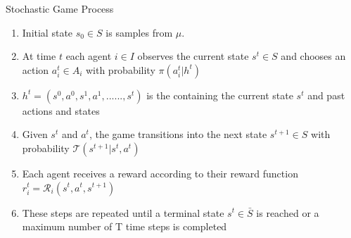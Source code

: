 \begin{frame}{Stochastic Game Process}

\begin{enumerate}
    \item<1-> Initial state $s_0 \in S$ is samples from $\mu$.
    \item<2-> At time $t$ each agent $i \in I$ observes the current state $s^{t} \in S$ and chooses an action $a^{t}_i \in A_i$ with probability $\pi(a^{t}_i|h^{t})$ 
    \vspace{2pt}
    \blist
        \item<3-> $h^t = (s^0, a^0, s^1, a^1, ......, s^t)$ is the  containing the current state $s^t$ and past  actions and states
    \elist
    \vspace{2pt}
    \item<4-> Given $s^t$ and $a^t$, the game transitions into the next state $s^{t+1} \in S$ with probability $\mathcal{T}(s^{t+1}|s^t, a^t)$
    \item<5->  Each agent receives a reward according to their reward function $r^{t}_{i} = \mathcal{R}_{i} (s^t, a^t, s^{t+1})$ 
    \item<6-> These steps are repeated until a terminal state $s^t \in \bar{S}$ is reached or a maximum number of T time steps is completed
\end{enumerate}
\end{frame}



